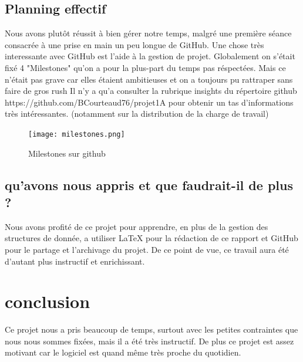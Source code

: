 \documentclass[12pt]{report}
\begin{document}
\section{Planning effectif}

Nous avons plutôt réussit à bien gérer notre temps, malgré une première séance consacrée à une prise en main un peu longue de GitHub. Une chose très interessante avec GitHub est l'aide à la gestion de projet. Globalement on s'était fixé 4 "Milestones" qu'on a pour la plus-part du temps pas réspectées. Mais ce n'était pas grave car elles étaient ambitieuses et on a toujours pu rattraper sans faire de gros rush\newline
Il n'y a qu'a consulter la rubrique insights du répertoire github https://github.com/BCourteaud76/projet1A pour obtenir un tas d'informations très intéressantes. (notamment sur la distribution de la charge de travail) 
\begin{figure}
  \centering
    \texttt{[image: milestones.png]}
    \caption{Milestones sur github}
\end{figure}
\section{qu'avons nous appris et que faudrait-il de plus ?}
Nous avons profité de ce projet pour apprendre, en plus de la gestion des structures de donnée, a utiliser LaTeX pour la rédaction de ce rapport et GitHub pour le partage et l'archivage du projet. De ce point de vue, ce travail aura été d'autant plus instructif et enrichissant.


\chapter{conclusion}

Ce projet nous a pris beaucoup de temps, surtout avec les petites contraintes que nous nous sommes fixées, mais il a été très instructif. De plus ce projet est assez motivant car le logiciel est quand même très proche du quotidien. 
\end{document}
